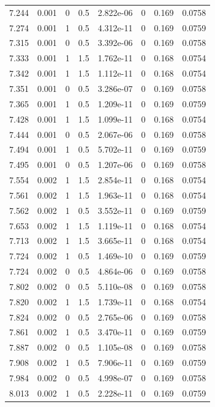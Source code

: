 \documentclass[preview]{standalone}
\begin{document}
{{{{{\begin{tabular}{L{1.2cm}C{1.2cm} C{0.3cm}C{0.5cm} C{1.4cm}C{1.4cm} C{1.4cm}C{1.4cm}}
  7.244  &  0.001  & 0     & 0.5 &  2.822e-06  & 0  & 0.169 &  0.0758   \\ 
  7.274  &  0.001  & 1     & 0.5 &  4.312e-11  & 0  & 0.169 &  0.0759   \\ 
  7.315  &  0.001  & 0     & 0.5 &  3.392e-06  & 0  & 0.169 &  0.0758   \\ 
  7.333  &  0.001  & 1     & 1.5 &  1.762e-11  & 0  & 0.168 &  0.0754   \\ 
  7.342  &  0.001  & 1     & 1.5 &  1.112e-11  & 0  & 0.168 &  0.0754   \\ 
  7.351  &  0.001  & 0     & 0.5 &  3.286e-07  & 0  & 0.169 &  0.0758   \\ 
  7.365  &  0.001  & 1     & 0.5 &  1.209e-11  & 0  & 0.169 &  0.0759   \\ 
  7.428  &  0.001  & 1     & 1.5 &  1.099e-11  & 0  & 0.168 &  0.0754   \\ 
  7.444  &  0.001  & 0     & 0.5 &  2.067e-06  & 0  & 0.169 &  0.0758   \\ 
  7.494  &  0.001  & 1     & 0.5 &  5.702e-11  & 0  & 0.169 &  0.0759   \\ 
  7.495  &  0.001  & 0     & 0.5 &  1.207e-06  & 0  & 0.169 &  0.0758   \\ 
  7.554  &  0.002  & 1     & 1.5 &  2.854e-11  & 0  & 0.168 &  0.0754   \\ 
  7.561  &  0.002  & 1     & 1.5 &  1.963e-11  & 0  & 0.168 &  0.0754   \\ 
  7.562  &  0.002  & 1     & 0.5 &  3.552e-11  & 0  & 0.169 &  0.0759   \\ 
  7.653  &  0.002  & 1     & 1.5 &  1.119e-11  & 0  & 0.168 &  0.0754   \\ 
  7.713  &  0.002  & 1     & 1.5 &  3.665e-11  & 0  & 0.168 &  0.0754   \\ 
  7.724  &  0.002  & 1     & 0.5 &  1.469e-10  & 0  & 0.169 &  0.0759   \\ 
  7.724  &  0.002  & 0     & 0.5 &  4.864e-06  & 0  & 0.169 &  0.0758   \\ 
  7.802  &  0.002  & 0     & 0.5 &  5.110e-08  & 0  & 0.169 &  0.0758   \\ 
  7.820  &  0.002  & 1     & 1.5 &  1.739e-11  & 0  & 0.168 &  0.0754   \\ 
  7.824  &  0.002  & 0     & 0.5 &  2.765e-06  & 0  & 0.169 &  0.0758   \\ 
  7.861  &  0.002  & 1     & 0.5 &  3.470e-11  & 0  & 0.169 &  0.0759   \\ 
  7.887  &  0.002  & 0     & 0.5 &  1.105e-08  & 0  & 0.169 &  0.0758   \\ 
  7.908  &  0.002  & 1     & 0.5 &  7.906e-11  & 0  & 0.169 &  0.0759   \\ 
  7.984  &  0.002  & 0     & 0.5 &  4.998e-07  & 0  & 0.169 &  0.0758   \\ 
  8.013  &  0.002  & 1     & 0.5 &  2.228e-11  & 0  & 0.169 &  0.0759   \\ 
\hline 
\end{tabular} 

}}}}}
\end{document}
